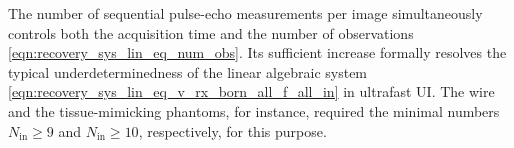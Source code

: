 The number of
sequential pulse-echo measurements per
image simultaneously controls both
the acquisition time and
the number of
observations
\eqref{eqn:recovery_sys_lin_eq_num_obs}.
Its sufficient increase formally resolves
the typical underdeterminedness of
the linear algebraic system
\eqref{eqn:recovery_sys_lin_eq_v_rx_born_all_f_all_in} in
ultrafast \ac{UI}.
The wire and
the tissue-mimicking phantoms, for instance, required
the minimal numbers
$N_{\text{in}} \geq 9$ and
$N_{\text{in}} \geq 10$,
respectively, for
this purpose.
